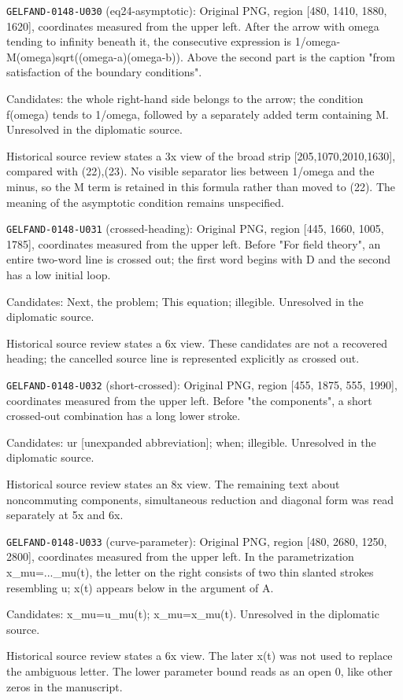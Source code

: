 \noindent\texttt{GELFAND-0148-U030} (eq24-asymptotic): Original PNG, region [480, 1410, 1880, 1620], coordinates measured from the upper left. After the arrow with omega tending to infinity beneath it, the consecutive expression is 1/omega-M(omega)sqrt((omega-a)(omega-b)). Above the second part is the caption "from satisfaction of the boundary conditions".\par
Candidates: the whole right-hand side belongs to the arrow; the condition f(omega) tends to 1/omega, followed by a separately added term containing M. Unresolved in the diplomatic source.\par
Historical source review states a 3x view of the broad strip [205,1070,2010,1630], compared with (22),(23). No visible separator lies between 1/omega and the minus, so the M term is retained in this formula rather than moved to (22). The meaning of the asymptotic condition remains unspecified.\par

\noindent\texttt{GELFAND-0148-U031} (crossed-heading): Original PNG, region [445, 1660, 1005, 1785], coordinates measured from the upper left. Before "For field theory", an entire two-word line is crossed out; the first word begins with D and the second has a low initial loop.\par
Candidates: Next, the problem; This equation; illegible. Unresolved in the diplomatic source.\par
Historical source review states a 6x view. These candidates are not a recovered heading; the cancelled source line is represented explicitly as crossed out.\par

\noindent\texttt{GELFAND-0148-U032} (short-crossed): Original PNG, region [455, 1875, 555, 1990], coordinates measured from the upper left. Before "the components", a short crossed-out combination has a long lower stroke.\par
Candidates: ur [unexpanded abbreviation]; when; illegible. Unresolved in the diplomatic source.\par
Historical source review states an 8x view. The remaining text about noncommuting components, simultaneous reduction and diagonal form was read separately at 5x and 6x.\par

\noindent\texttt{GELFAND-0148-U033} (curve-parameter): Original PNG, region [480, 2680, 1250, 2800], coordinates measured from the upper left. In the parametrization x\_mu=...\_mu(t), the letter on the right consists of two thin slanted strokes resembling u; x(t) appears below in the argument of A.\par
Candidates: x\_mu=u\_mu(t); x\_mu=x\_mu(t). Unresolved in the diplomatic source.\par
Historical source review states a 6x view. The later x(t) was not used to replace the ambiguous letter. The lower parameter bound reads as an open 0, like other zeros in the manuscript.\par

